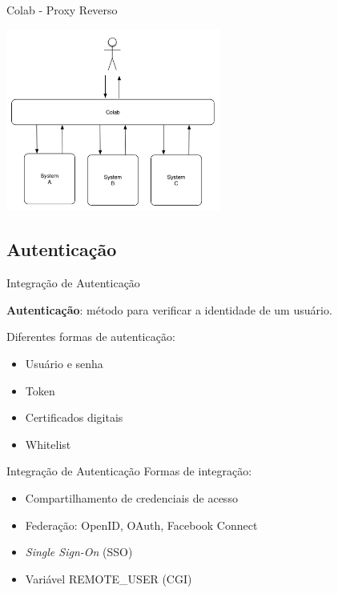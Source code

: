 \documentclass{beamer}
\begin{document}
\begin{frame}{Colab - Proxy Reverso}
  \begin{center}
    \includegraphics[height=6cm]{colab-basics}
  \end{center}
\end{frame}

\subsection{Autenticação}

\begin{frame}{Integração de Autenticação}

  \textbf{Autenticação}: método para verificar a identidade de um usuário.

  \hfill \break

  Diferentes formas de autenticação:

  \begin{itemize}
  \item {
    Usuário e senha
  }
  \item {
    Token
  }
  \item{
    Certificados digitais
  }
  \item{
    Whitelist
  }
  \end{itemize}
\end{frame}

\begin{frame}{Integração de Autenticação}
  Formas de integração:
  \begin{itemize}
    \item{Compartilhamento de credenciais de acesso}
    \item{Federação: OpenID, OAuth, Facebook Connect}
    \item{\textit{Single Sign-On} (SSO)}
    \item{Variável REMOTE\_USER (CGI)} \cite{robinson2004rfc}
  \end{itemize}
\end{frame}
\end{document}
